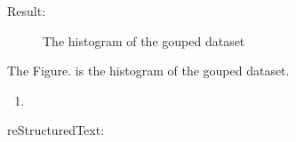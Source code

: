 \documentclass[letterpaper,11pt,english]{sphinxmanual}
\begin{document}
Result:

\begin{figure}[htbp]
\centering
\capstart

\noindent{}
\caption{The histogram of the gouped dataset}\label{\detokenize{rtxt:id14}}\label{\detokenize{rtxt:fig-hist-demo}}\end{figure}

The Figure. {\hyperref[\detokenize{rtxt:fig-hist-demo}]{}} is the histogram of the gouped dataset.
\begin{enumerate}
\def\theenumi{\arabic{enumi}}
\def\labelenumi{\theenumi .}
\makeatletter\def\p@enumii{\p@enumi \theenumi .}\makeatother
\setcounter{enumi}{4}
\item {} 

\end{enumerate}

reStructuredText:
\end{document}
